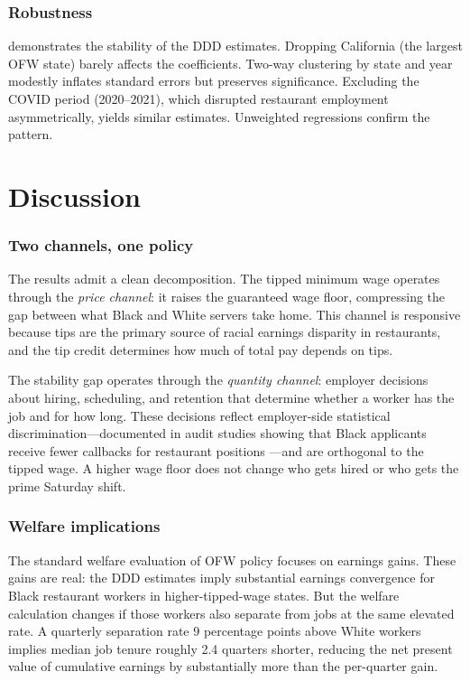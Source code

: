 \documentclass[12pt]{article}
\begin{document}


\subsubsection*{Robustness}  demonstrates the stability of the DDD estimates. Dropping California (the largest OFW state) barely affects the coefficients. Two-way clustering by state and year modestly inflates standard errors but preserves significance. Excluding the COVID period (2020--2021), which disrupted restaurant employment asymmetrically, yields similar estimates. Unweighted regressions confirm the pattern.



\section{Discussion}

\subsubsection*{Two channels, one policy} The results admit a clean decomposition. The tipped minimum wage operates through the \textit{price channel}: it raises the guaranteed wage floor, compressing the gap between what Black and White servers take home. This channel is responsive because tips are the primary source of racial earnings disparity in restaurants, and the tip credit determines how much of total pay depends on tips.

The stability gap operates through the \textit{quantity channel}: employer decisions about hiring, scheduling, and retention that determine whether a worker has the job and for how long. These decisions reflect employer-side statistical discrimination---documented in audit studies showing that Black applicants receive fewer callbacks for restaurant positions \citep{pager2009discrimination}---and are orthogonal to the tipped wage. A higher wage floor does not change who gets hired or who gets the prime Saturday shift.

\subsubsection*{Welfare implications} The standard welfare evaluation of OFW policy focuses on earnings gains. These gains are real: the DDD estimates imply substantial earnings convergence for Black restaurant workers in higher-tipped-wage states. But the welfare calculation changes if those workers also separate from jobs at the same elevated rate. A quarterly separation rate 9 percentage points above White workers implies median job tenure roughly 2.4 quarters shorter, reducing the net present value of cumulative earnings by substantially more than the per-quarter gain.
\end{document}
